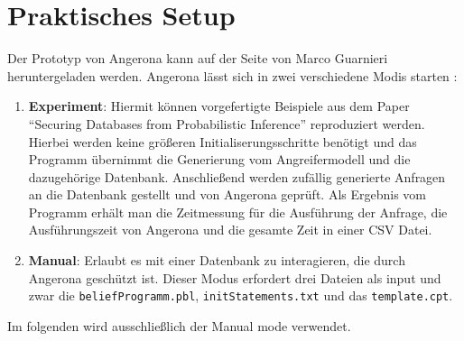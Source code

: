 \documentclass[german,version-2020-11]{uzl-thesis}
\begin{document}
\section{Praktisches Setup} \label{2.2}
Der Prototyp von Angerona kann auf der Seite von Marco Guarnieri \cite{6} heruntergeladen werden. Angerona lässt sich in zwei verschiedene Modis starten :
\begin{enumerate}
	\item \textbf{Experiment}: Hiermit können vorgefertigte Beispiele aus dem Paper \enquote{Securing Databases from Probabilistic Inference}\cite{guarnieri2017securing} reproduziert werden. Hierbei werden keine größeren Initialiserungsschritte benötigt und das Programm übernimmt die Generierung vom Angreifermodell und die dazugehörige Datenbank. Anschließend werden zufällig generierte Anfragen an die Datenbank gestellt und von Angerona geprüft. Als Ergebnis vom Programm erhält man die Zeitmessung für die Ausführung der Anfrage, die Ausführungszeit von Angerona und die gesamte Zeit in einer CSV Datei.
	\item \textbf{Manual}: Erlaubt es mit einer Datenbank zu interagieren, die durch Angerona geschützt ist. Dieser Modus erfordert drei Dateien als input und zwar die \texttt{beliefProgramm.pbl}, \texttt{initStatements.txt} und das \texttt{template.cpt}.
\end{enumerate}
Im folgenden wird ausschließlich der Manual mode verwendet.
\end{document}
